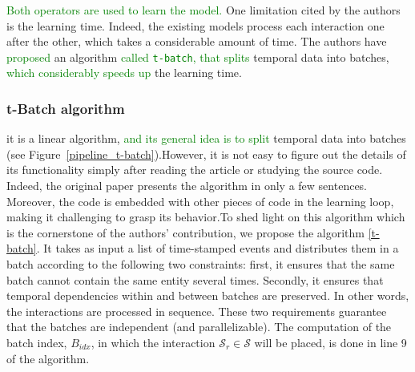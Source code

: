 \textcolor{green}{Both operators are used to learn the model.}
One limitation cited by the authors is the learning time. Indeed, the existing models process each interaction one after the other, which takes a considerable amount of time. The authors have \textcolor{green}{proposed} %
an algorithm \textcolor{green}{called \texttt{t-batch}, that splits} %
temporal data into batches, \textcolor{green}{which considerably speeds up} %
the learning time. %

\subsubsection{t-Batch algorithm}

it is a linear algorithm, %
\textcolor{green}{and its general idea is to split} temporal data into batches 
(see Figure~\ref{pipeline_t-batch}).However, it is not easy to figure out the details of its functionality simply after reading the article or studying the source code. Indeed, the original paper presents the algorithm in only a few sentences. Moreover, the code is embedded with other pieces of code in the learning loop, making it challenging to grasp its behavior.To shed light on this algorithm which is the cornerstone of the authors' contribution, we propose the algorithm \ref{t-batch}. It takes as input a list of time-stamped events and distributes them in a batch according to the following two constraints: first, it ensures that the same batch cannot contain the same entity several times. Secondly, it ensures that temporal dependencies within and between batches are preserved. In other words, the interactions are processed in sequence. These two requirements guarantee that the batches are independent (and parallelizable). The computation of the batch index, $B_{idx}$, in which the interaction $\mathcal{S}_r \in \mathcal{S}$ will be placed, is done in line 9 of the algorithm. 

